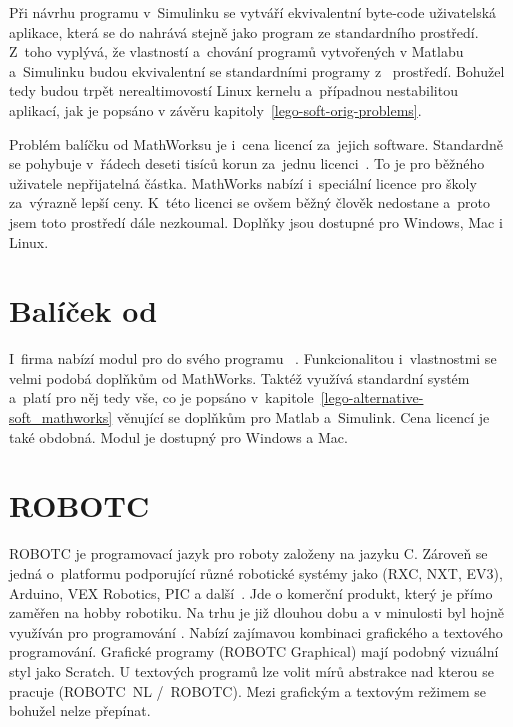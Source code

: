 Při návrhu programu v~Simulinku se vytváří ekvivalentní byte-code uživatelská aplikace, která se do  nahrává stejně jako program ze standardního \lego{} prostředí. 
Z~toho vyplývá, že vlastností a~chování programů vytvořených v Matlabu a~Simulinku budou ekvivalentní se standardními programy z~\lego{} prostředí.
Bohužel tedy budou trpět nerealtimovostí Linux kernelu a~případnou nestabilitou aplikací, jak je popsáno v závěru kapitoly~\ref{lego-soft-orig-problems}.  

Problém balíčku od MathWorksu je i~cena licencí za~jejich software. 
Standardně se pohybuje v~řádech deseti tisíců korun za~jednu licenci~\cite{legoProgramingPlatform_MathWork_Humusoft-price}.
To je pro běžného uživatele nepřijatelná částka. 
MathWorks nabízí i~speciální licence pro školy za~výrazně lepší ceny. 
K~této licenci se ovšem běžný člověk nedostane a~proto jsem toto prostředí dále nezkoumal.
Doplňky jsou dostupné pro Windows, Mac i  Linux. 
 

\section{Balíček od \NI}

I~firma \NI{} nabízí modul pro \legoM{} do svého programu \labview{}~\cite{legoProgramingPlatform_NI_LabVIEW}. 
Funkcionalitou i~vlastnostmi se velmi podobá doplňkům od MathWorks.
Taktéž využívá standardní \lego{} systém a~platí pro něj tedy vše, co je popsáno v~kapitole~\ref{lego-alternative-soft_mathworks} věnující se doplňkům pro Matlab a~Simulink. 
Cena licencí je také obdobná. Modul je dostupný pro Windows a Mac. 


\section{ROBOTC}

ROBOTC je programovací jazyk pro roboty založeny na jazyku C. 
Zároveň se jedná o~platformu podporující různé robotické systémy jako \legoM{} (RXC, NXT, EV3), Arduino, VEX Robotics, PIC a další~\cite{legoProgramingPlatform_ROBOTC}.
Jde o komerční produkt, který je přímo zaměřen na hobby robotiku.
Na trhu je již dlouhou dobu a v minulosti byl hojně využíván pro programování \legoNXT{}.
Nabízí zajímavou kombinaci grafického a textového programování. 
Grafické programy (ROBOTC Graphical) mají podobný vizuální styl jako Scratch. 
U textových programů lze volit mírů abstrakce nad kterou se pracuje (ROBOTC~NL /~ROBOTC). 
Mezi grafickým a textovým režimem se bohužel nelze přepínat.

